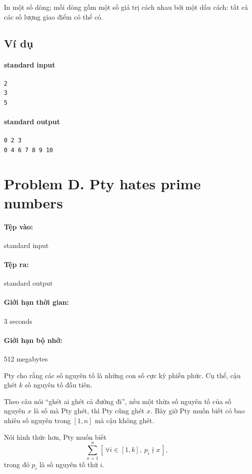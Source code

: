 \documentclass[11pt]{article}
\begin{document}
In một số dòng; mỗi dòng gồm một số giá trị cách nhau bởi một dấu cách: tất
cả các số lượng giao điểm có thể có.

\subsection*{Ví dụ}

\paragraph{standard input}
\begin{verbatim}
2
3
5
\end{verbatim}

\paragraph{standard output}
\begin{verbatim}
0 2 3
0 4 6 7 8 9 10
\end{verbatim}

\section{Problem D. Pty hates prime numbers}

\paragraph{Tệp vào:} standard input
\paragraph{Tệp ra:} standard output
\paragraph{Giới hạn thời gian:} 3 seconds
\paragraph{Giới hạn bộ nhớ:} 512 megabytes

Pty cho rằng các số nguyên tố là những con số cực kỳ phiền phức. Cụ thể, cậu
ghét \(k\) số nguyên tố đầu tiên.

Theo câu nói ``ghét ai ghét cả đường đi'', nếu một thừa số nguyên tố của số
nguyên \(x\) là số mà Pty ghét, thì Pty cũng ghét \(x\). Bây giờ Pty muốn biết
có bao nhiêu số nguyên trong \([1,n]\) mà cậu không ghét.

Nói hình thức hơn, Pty muốn biết
\[
  \sum_{x=1}^{n} [\,\forall i\in[1,k],\ p_i\nmid x\,],
\]
trong đó \(p_i\) là số nguyên tố thứ \(i\).
\end{document}
